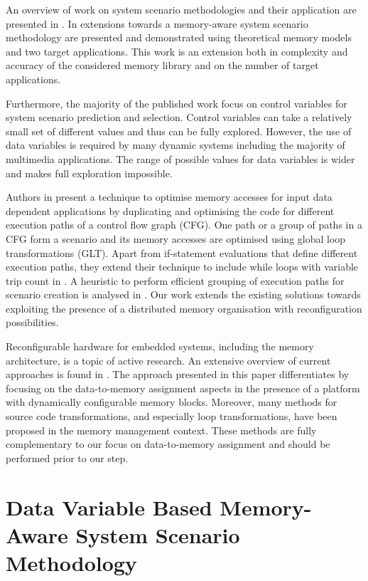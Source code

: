 \documentclass[smallcondensed]{svjour3}
\begin{document}
An overview of work on system scenario methodologies and their application are presented in \cite{Gheorghita2007}. 
In \cite{Fil12} extensions towards a memory-aware system scenario methodology are presented and demonstrated using theoretical memory models and two target applications. 
This work is an extension both in complexity and accuracy of the considered memory library and on the number of target applications. 

Furthermore, the majority of the published work focus on control variables for system scenario prediction and selection. 
Control variables can take a relatively small set of different values and thus can be fully explored. However, the use of data variables \cite{Elena2010} is required by many dynamic systems including the majority of multimedia applications. 
The range of possible values for data variables is wider and makes full exploration impossible. 

Authors in \cite{Pal06} present a technique to optimise memory accesses for input data dependent applications by duplicating and optimising the code for different execution paths of a control flow graph (CFG). 
One path or a group of paths in a CFG form a scenario and its memory accesses are optimised using global loop transformations (GLT). 
Apart from if-statement evaluations that define different execution paths, they extend their technique to include while loops with variable trip count in \cite{Pal06b}. 
A heuristic to perform efficient grouping of execution paths for scenario creation is analysed in \cite{Pal07}. 
Our work extends the existing solutions towards exploiting the presence of a distributed memory organisation with reconfiguration possibilities.

Reconfigurable hardware for embedded systems, including the memory architecture, is a topic of active research. 
An extensive overview of current approaches is found in \cite{Garcia}. 
The approach presented in this paper differentiates by focusing on the data-to-memory assignment aspects in the presence of a platform with dynamically configurable memory blocks. 
Moreover, many methods for source code transformations, and especially loop transformations, have been proposed in the memory management context. 
These methods are fully complementary to our focus on data-to-memory assignment and should be performed prior to our step. 

\section{Data Variable Based Memory-Aware System Scenario Methodology}
\label{sec:methodology}
\end{document}
